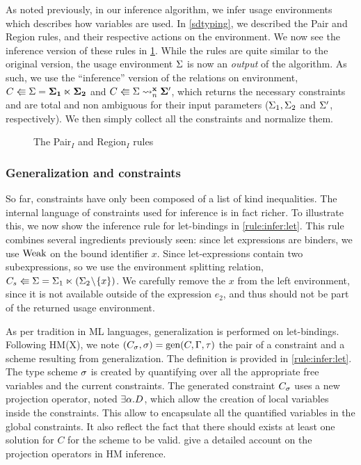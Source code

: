 As noted previously, in our inference algorithm, we infer
usage environments which describes how variables are used. In
\cref{sdtyping}, we described the {\sc Pair} and {\sc Region} rules, and their
respective actions on the environment. We now see the inference version
of these rules in \cref{rule:infer:envrules}.
While the rules are quite similar to the original version, the usage
environment $\Sv$ is now an \emph{output} of the algorithm.
As such, we use the ``inference'' version of the relations on
environment,
$\bsplit{C}{\Sv}{\bf{\Sv_1}}{\bf{\Sv_2}}$ and $\bregion{C}{\bf{x}}{\Sv}{\bf\Sv'}$,
which returns the necessary constraints and
are total and non ambiguous for their input parameters ($\Sv_1, \Sv_2$ and $\Sv'$, respectively).
We then simply collect all the constraints and normalize them.

\begin{figure}[!h]
  \centering
  \begin{mathpar}
    
  \end{mathpar}
  \caption{The {\sc Pair$_I$} and {\sc Region$_I$} rules}
  \label{rule:infer:envrules}
\end{figure}

\subsubsection{Generalization and constraints}


So far, constraints have only been composed of a list of kind inequalities.
The internal language of constraints used for inference is in fact
richer.
To illustrate this, we now show the inference rule for let-bindings
in \cref{rule:infer:let}.
This rule combines several ingredients previously seen:
since let expressions are binders, we use $\Weaken$ on the bound
identifier $x$. Since let-expressions contain
two subexpressions, so we use the environment splitting relation,
$\bsplit{C_s}{\Sv}{\Sv_1}{(\Sv_2 \Sdel{x})}$. We carefully remove the $x$ from
the left environment, since it is not available outside of the expression
$e_2$, and thus should not be part of the returned usage environment.

As per tradition in ML languages, generalization is performed
on let-bindings.
Following HM(X), we note $(C_\schm, \schm) = \generalize{C}{\E}{\tau}$
the pair of a constraint and a scheme resulting from
generalization. The definition is provided in \cref{rule:infer:let}.
The type scheme $\schm$ is created by quantifying over all the appropriate
free variables and the current constraints.
The generated constraint $C_\schm$ uses a new projection operator,
noted $\Cproj{\tvar}{D}$, which
allow the creation of local variables inside the constraints.
This allow to encapsulate all the quantified variables in the global constraints.
It also reflect the fact that there
should exists at least one solution for $C$ for the scheme to be valid.
\citet{DBLP:journals/tapos/OderskySW99} give a detailed account
on the projection operators in HM inference.

